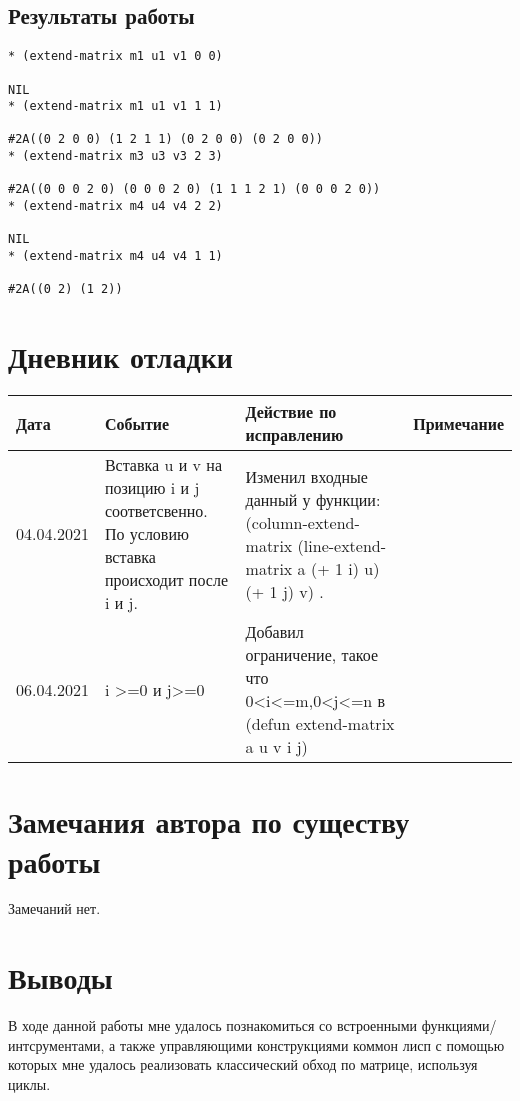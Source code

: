 \documentclass[12pt]{article}
\begin{document}
\subsection{Результаты работы}
\begin{verbatim}
* (extend-matrix m1 u1 v1 0 0)

NIL
* (extend-matrix m1 u1 v1 1 1)

#2A((0 2 0 0) (1 2 1 1) (0 2 0 0) (0 2 0 0))
* (extend-matrix m3 u3 v3 2 3)

#2A((0 0 0 2 0) (0 0 0 2 0) (1 1 1 2 1) (0 0 0 2 0))
* (extend-matrix m4 u4 v4 2 2)

NIL
* (extend-matrix m4 u4 v4 1 1)

#2A((0 2) (1 2))
\end{verbatim}
%

\section{Дневник отладки}
\begin{tabular}{|p{50pt}|p{130pt}|p{130pt}|p{70pt}|}
\hline
Дата & Событие & Действие по исправлению & Примечание \\ \hline
04.04.2021 & Вставка u и v на позицию i и j соответсвенно. По условию вставка происходит после i и j.  & Изменил входные данный у функции: (column-extend-matrix (line-extend-matrix a (+ 1 i) u) (+ 1 j) v) . &\\
\hline
06.04.2021 & i >=0 и j>=0  & Добавил ограничение, такое что 0<i<=m,0<j<=n в (defun extend-matrix a u v i j) &\\
\hline
\end{tabular}

\section{Замечания автора по существу работы}
Замечаний нет.

\section{Выводы}
В ходе данной работы мне удалось познакомиться со встроенными функциями/интсрументами, а также управляющими конструкциями коммон лисп с помощью которых мне удалось реализовать классический обход по матрице, используя циклы. 
\end{document}
